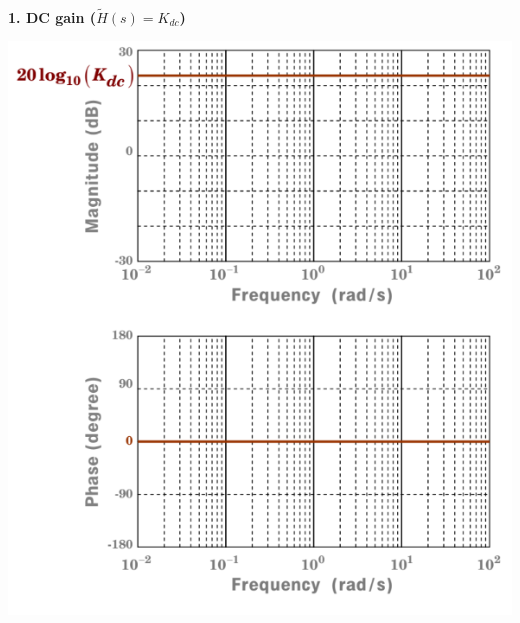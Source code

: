 \documentclass[landscape,a4paper]{extarticle}
\newenvironment{Figure}
  {\par\medskip\noindent\minipage{\linewidth}}
  {\endminipage\par\medskip}
\begin{document}
\begin{multicols*}{5}
    \leavevmode\\
    \textbf{1. DC gain ($\tilde{H}(s) = K_{dc}$)}
    \begin{Figure}
        \centering
        \includegraphics[width=\linewidth]{bode_dcGain.png}        
    \end{Figure}


\end{multicols*}
\end{document}
